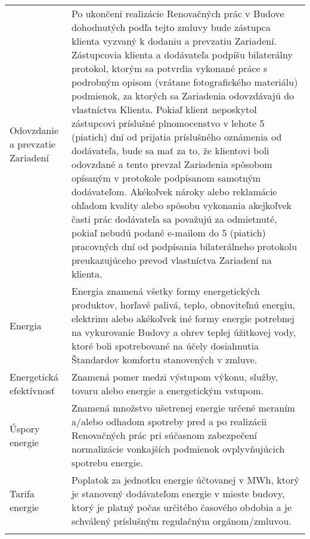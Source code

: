 \documentclass[a4paper]{article}
\begin{document}
\begin{longtabu}{|X|X[2]|}
 \\\tabucline{}

   \hline

   Odovzdanie a prevzatie Zariadení & Po ukončení realizácie Renovačných prác v Budove dohodnutých podľa tejto zmluvy bude zástupca klienta vyzvaný k dodaniu a prevzatiu Zariadení. Zástupcovia klienta a dodávateľa podpíšu bilaterálny protokol, ktorým sa potvrdia vykonané práce s podrobným opisom (vrátane fotografického materiálu) podmienok, za ktorých sa Zariadenia odovzdávajú do vlastníctva Klienta. 
   Pokiaľ klient neposkytol zástupcovi príslušné plnomocenstvo v lehote 5 (piatich) dní od prijatia príslušného oznámenia od dodávateľa, bude sa mať za to, že klientovi boli odovzdané a tento prevzal Zariadenia spôsobom opísaným v protokole podpísanom samotným dodávateľom. 
   Akékoľvek nároky alebo reklamácie ohľadom kvality alebo spôsobu vykonania akejkoľvek časti prác dodávateľa sa považujú za odmietnuté, pokiaľ nebudú podané e-mailom do 5 (piatich) pracovných dní od podpísania bilaterálneho protokolu preukazujúceho prevod vlastníctva Zariadení na klienta.
   \\\tabucline{}

   \hline

   Energia & Energia znamená všetky formy energetických produktov, horľavé palivá, teplo, obnoviteľnú energiu, elektrinu alebo akékoľvek iné formy energie potrebnej na vykurovanie Budovy a ohrev teplej úžitkovej vody, ktoré boli spotrebované na účely dosiahnutia Štandardov komfortu stanovených v zmluve.\\\tabucline{}

   \hline

   Energetická efektívnosť & Znamená pomer medzi výstupom výkonu, služby, tovaru alebo energie a energetickým vstupom.\\\tabucline{}

   \hline

   Úspory energie &Znamená množstvo ušetrenej energie určené meraním a/alebo odhadom spotreby pred a po realizácii Renovačných prác pri súčasnom zabezpečení normalizácie vonkajších podmienok ovplyvňujúcich spotrebu energie. \\\tabucline{}

   \hline

   Tarifa energie & Poplatok za jednotku energie účtovanej v MWh, ktorý je stanovený dodávateľom energie v mieste budovy, ktorý je platný počas určitého časového obdobia a je schválený príslušným regulačným orgánom/zmluvou.\\\tabucline{}


\end{longtabu}
\end{document}
